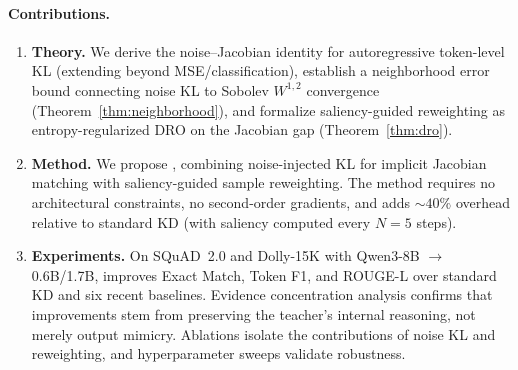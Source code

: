 \paragraph{Contributions.}
\begin{enumerate}
\item \textbf{Theory.}
  We derive the noise--Jacobian identity for autoregressive token-level KL (extending \citealt{srinivas2018knowledge} beyond MSE/classification), establish a neighborhood error bound connecting noise KL to Sobolev $W^{1,2}$ convergence (Theorem~\ref{thm:neighborhood}), and formalize saliency-guided reweighting as entropy-regularized DRO on the Jacobian gap (Theorem~\ref{thm:dro}).

\item \textbf{Method.}
  We propose \sagd{}, combining noise-injected KL for implicit Jacobian matching with saliency-guided sample reweighting.
  The method requires no architectural constraints, no second-order gradients, and adds ${\sim}40\%$ overhead relative to standard KD (with saliency computed every $N{=}5$ steps).

\item \textbf{Experiments.}
  On SQuAD~2.0 and Dolly-15K with Qwen3-8B $\to$ 0.6B/1.7B, \sagd{} improves Exact Match, Token F1, and ROUGE-L over standard KD and six recent baselines.
  Evidence concentration analysis confirms that improvements stem from preserving the teacher's internal reasoning, not merely output mimicry.
  Ablations isolate the contributions of noise KL and reweighting, and hyperparameter sweeps validate robustness.
\end{enumerate}

